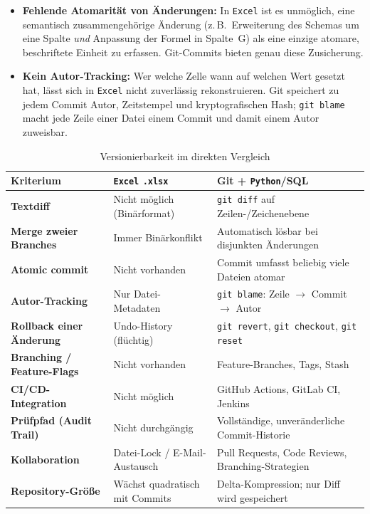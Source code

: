 \documentclass[12pt,a4paper]{report}
\theoremstyle{definition}
\theoremstyle{remark}
\newcommand{\excel}{\texttt{Excel}}
\newcommand{\py}{\texttt{Python}}
\newcommand{\code}[1]{\texttt{#1}}
\begin{document}
\begin{itemize}[leftmargin=1.5em, itemsep=3pt]
  \item \textbf{Fehlende Atomarität von Änderungen:}
        In \excel{} ist es unmöglich, eine semantisch zusammengehörige
        Änderung (z.\,B.\ Erweiterung des Schemas um eine Spalte
        \emph{und} Anpassung der Formel in Spalte~G) als eine einzige
        atomare, beschriftete Einheit zu erfassen.
        Git-Commits bieten genau diese Zusicherung.

  \item \textbf{Kein Autor-Tracking:}
        Wer welche Zelle wann auf welchen Wert gesetzt hat, lässt sich
        in \excel{} nicht zuverlässig rekonstruieren. Git speichert
        zu jedem Commit Autor, Zeitstempel und kryptografischen Hash;
        \code{git blame} macht jede Zeile einer Datei einem
        Commit und damit einem Autor zuweisbar.
\end{itemize}

\begin{table}[H]
\centering
\caption{Versionierbarkeit im direkten Vergleich}
\label{tab:git-vergleich}
\renewcommand{\arraystretch}{1.35}
\begin{tabularx}{\linewidth}{>{\bfseries\footnotesize}l
                              >{\footnotesize}X
                              >{\footnotesize}X}
\toprule
Kriterium                 & \excel{} \code{.xlsx}            & Git + \py{}/SQL \\
\midrule
Textdiff                  & Nicht möglich (Binärformat)      & \code{git diff} auf Zeilen-/Zeichenebene \\
Merge zweier Branches     & Immer Binärkonflikt              & Automatisch lösbar bei disjunkten Änderungen \\
Atomic commit             & Nicht vorhanden                  & Commit umfasst beliebig viele Dateien atomar \\
Autor-Tracking            & Nur Datei-Metadaten              & \code{git blame}: Zeile $\to$ Commit $\to$ Autor \\
Rollback einer Änderung   & Undo-History (flüchtig)          & \code{git revert}, \code{git checkout}, \code{git reset} \\
Branching / Feature-Flags & Nicht vorhanden                  & Feature-Branches, Tags, Stash \\
CI/CD-Integration         & Nicht möglich                    & GitHub Actions, GitLab CI, Jenkins \\
Prüfpfad (Audit Trail)    & Nicht durchgängig                & Vollständige, unveränderliche Commit-Historie \\
Kollaboration             & Datei-Lock / E-Mail-Austausch    & Pull Requests, Code Reviews, Branching-Strategien \\
Repository-Größe          & Wächst quadratisch mit Commits   & Delta-Kompression; nur Diff wird gespeichert \\
\bottomrule
\end{tabularx}
\end{table}
\end{document}
